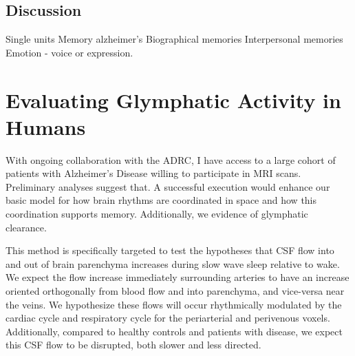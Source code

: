 \subsection*{Discussion}
Single units
Memory alzheimer's
Biographical memories
Interpersonal memories
Emotion - voice or expression.

\section*{Evaluating Glymphatic Activity in Humans}
With ongoing collaboration with the ADRC, I have access to a large cohort of patients with Alzheimer's Disease willing to participate in MRI scans. Preliminary analyses suggest that. A successful execution would enhance our basic model for how brain rhythms are coordinated in space and how this coordination supports memory. Additionally, we evidence of glymphatic clearance.

This method is specifically targeted to test the hypotheses that CSF flow into and out of brain parenchyma increases during slow wave sleep relative to wake. We expect the flow increase immediately surrounding arteries to have an increase oriented orthogonally from blood flow and into parenchyma, and vice-versa near the veins. We hypothesize these flows will occur rhythmically modulated by the cardiac cycle and respiratory cycle for the periarterial and perivenous voxels. Additionally, compared to healthy controls and patients with disease, we expect this CSF flow to be disrupted, both slower and less directed.



